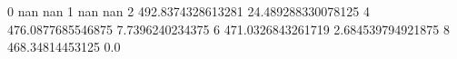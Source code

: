 0 nan nan
1 nan nan
2 492.8374328613281 24.489288330078125
4 476.0877685546875 7.7396240234375
6 471.0326843261719 2.684539794921875
8 468.34814453125 0.0
